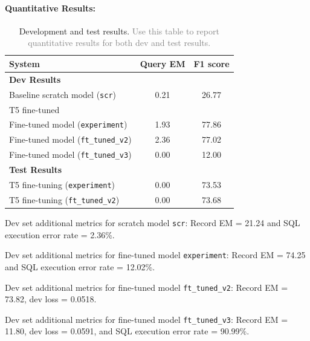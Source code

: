 \documentclass{article}
\begin{document}
\paragraph{Quantitative Results:}
\begin{table}[h!]
  \centering
  \begin{tabular}{lcc}
    \toprule
    System & Query EM & F1 score\\
    \midrule
    \multicolumn{3}{l}{\textbf{Dev Results}} \\
    \midrule

    Baseline scratch model (\texttt{scr}) & 0.21 & 26.77 \\[5pt]
    \multicolumn{3}{l}{T5 fine-tuned} \\
    Fine-tuned model (\texttt{experiment}) & 1.93 & 77.86 \\[5pt]
    Fine-tuned model (\texttt{ft\_tuned\_v2}) & 2.36 & 77.02 \\[5pt]
    Fine-tuned model (\texttt{ft\_tuned\_v3}) & 0.00 & 12.00 \\[5pt]

    \midrule
    \multicolumn{3}{l}{\textbf{Test Results}} \\
    \midrule
    T5 fine-tuning (\texttt{experiment}) & 0.00 & 73.53 \\
    T5 fine-tuning (\texttt{ft\_tuned\_v2}) & 0.00 & 73.68 \\
    \bottomrule
  \end{tabular}
  \caption{Development and test results. \textcolor{gray}{Use this
  table to report quantitative results for both dev and test results.}}
  \label{tab:results}
\end{table}

Dev set additional metrics for scratch model \texttt{scr}: Record EM
= 21.24 and SQL execution error rate = 2.36\%.

Dev set additional metrics for fine-tuned model \texttt{experiment}:
Record EM = 74.25 and SQL execution error rate = 12.02\%.

Dev set additional metrics for fine-tuned model
\texttt{ft\_tuned\_v2}: Record EM = 73.82, dev loss = 0.0518.

Dev set additional metrics for fine-tuned model
\texttt{ft\_tuned\_v3}: Record EM = 11.80, dev loss = 0.0591,
and SQL execution error rate = 90.99\%.
\end{document}
